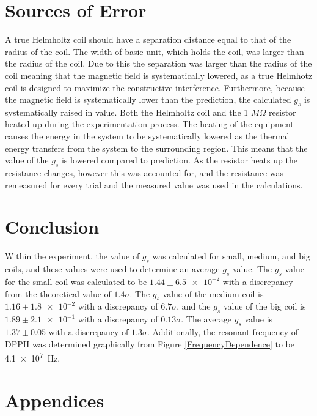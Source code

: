 \documentclass[a4paper]{article}
\begin{document}
\section{Sources of Error}
\qq A true Helmholtz coil should have a separation distance equal to
that of the radius of the coil. The width of basic unit, which holds
the coil, was larger than the radius of the coil. Due to this the
separation was larger than the radius of the coil meaning that the
magnetic field is systematically lowered, as a true Helmhotz coil is
designed to maximize the constructive interference.  Furthermore,
because the magnetic field is systematically lower than the
prediction, the calculated $g_s$ is systematically raised in
value. Both the Helmholtz coil and the 1 $M \Omega$ resistor heated up
during the experimentation process. The heating of the equipment
causes the energy in the system to be systematically lowered as the
thermal energy transfers from the system to the surrounding region. This means
that the value of the $g_s$ is lowered compared to prediction. As the
resistor heats up the resistance changes, however this was accounted
for, and the resistance was remeasured for every trial and the
measured value was used in the calculations.

\section{Conclusion}
\qq Within the experiment, the value of \( g_s \) was calculated for small,
medium, and big coils, and these values were used to determine an average
\( g_s \) value. The \( g_s \) value for the small coil was calculated to be
\( 1.44 \pm \num{6.5e-2} \) with a discrepancy from the theoretical value of
\( 1.4 \sigma \). The \( g_s \) value of the medium coil is
\( 1.16 \pm \num{1.8e-2} \) with a discrepancy of \( 6.7 \sigma \), and the
\( g_s \) value of the big coil is \( 1.89 \pm \num{2.1e-1} \) with a
discrepancy of \( 0.13 \sigma \). The average \( g_s \) value is
\( 1.37 \pm 0.05 \) with a discrepancy of \( 1.3 \sigma \). Additionally, the
resonant frequency of DPPH was determined graphically from Figure
\ref{FrequencyDependence} to be \SI{4.1e7}{\hertz}.

\section{Appendices}
\end{document}
